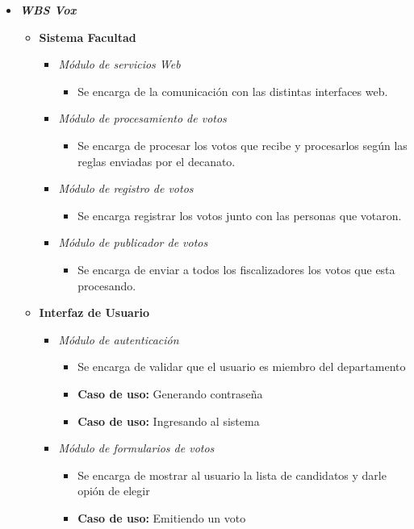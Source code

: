 \begin{itemize}
 \item {\bf \emph{WBS Vox}}
\begin{itemize}
 \item {\bf Sistema Facultad}
\begin{itemize}
 \item \emph{M\'odulo de servicios Web} 
\begin{itemize}
 \item Se encarga de la comunicación con las distintas interfaces web.
\end{itemize}
 \item \emph{M\'odulo de procesamiento de votos} 
\begin{itemize}
 \item Se encarga de procesar los votos que recibe y procesarlos según las reglas enviadas por el decanato.
\end{itemize}
 \item \emph{M\'odulo de registro de votos} 
\begin{itemize}
 \item Se encarga registrar los votos junto con las personas que votaron.
\end{itemize}
 \item \emph{M\'odulo de publicador de votos} 
\begin{itemize}
 \item Se encarga de enviar a todos los fiscalizadores los votos que esta procesando.
\end{itemize}
\end{itemize}
 \item {\bf Interfaz de Usuario}
\begin{itemize}
 \item \emph{M\'odulo de autenticación}
\begin{itemize}
 \item Se encarga de validar que el usuario es miembro del departamento
 \item {\bf Caso de uso:} Generando contrase\~na
 \item {\bf Caso de uso:} Ingresando al sistema
\end{itemize}
 \item \emph{M\'odulo de formularios de votos}
\begin{itemize}
 \item Se encarga de mostrar al usuario la lista de candidatos y darle opión de elegir
 \item {\bf Caso de uso:} Emitiendo un voto

\end{itemize}
\end{itemize}
\end{itemize}
\end{itemize}
